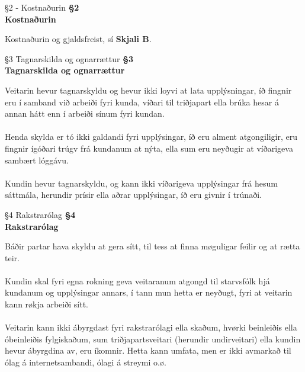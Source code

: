 \begin{center}
	 {§2 - Kostnaðurin}
	\textbf{§2 \\ Kostnaðurin}
\end{center}
Kostnaðurin og gjaldsfreist, sí \textbf{Skjali B}.

\begin{center}
	 {§3 Tagnarskilda og ognarrættur}
	\textbf{§3 \\ Tagnarskilda og ognarrættur}
\end{center}
Veitarin hevur tagnarskyldu og hevur ikki loyvi at lata upplýsningar, íð fingnir eru í samband við arbeiði fyri kunda, víðari til triðjapart ella brúka hesar á annan hátt enn í arbeiði sínum fyri kundan. \\ \\
Henda skylda er tó ikki galdandi fyri upplýsingar, íð eru alment atgongiligir, eru fingnir ígóðari trúgv frá kundanum at nýta, ella sum eru neyðugir at víðarigeva sambært lóggávu. \\ \\
Kundin hevur tagnarskyldu, og kann ikki víðarigeva upplýsingar frá hesum sáttmála, herundir prísir ella aðrar upplýsingar, íð eru givnir í trúnaði.

\begin{center}
	 {§4 Rakstrarólag}
	\textbf{§4 \\ Rakstrarólag}
\end{center}
Báðir partar hava skyldu at gera sítt, til tess at finna møguligar feilir og at rætta teir. \\ \\
Kundin skal fyri egna rokning geva veitaranum atgongd til starvsfólk hjá kundanum og upplýsingar annars, í tann mun hetta er neyðugt, fyri at veitarin kann røkja arbeiði sítt. \\ \\
Veitarin kann ikki ábyrgdast fyri rakstrarólagi ella skaðum, hvørki beinleiðis ella óbeinleiðis fylgiskaðum, sum triðjapartsveitari (herundir undirveitari) ella kundin hevur ábyrgdina av, eru íkomnir. Hetta kann umfata, men er ikki avmarkað til ólag á internetsambandi, ólagi á streymi o.ø.

